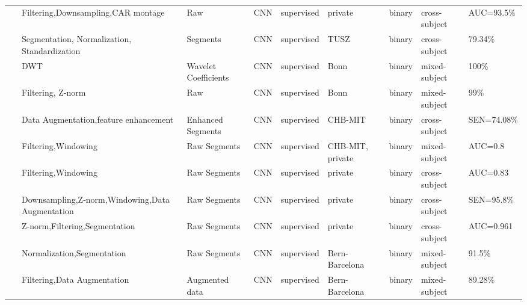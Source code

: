\begin{table*}[ht]
\begin{tabular}{p{0.4cm}p{2.8cm}p{2cm}p{1.5cm}p{1.9cm}p{1.9cm}p{0.8cm}p{1.8cm}p{1.5cm}}
~\cite{Seizure56} & Filtering,Downsampling,\newline CAR montage & Raw & CNN & supervised & private & binary & cross-subject & AUC=93.5\% \\
~\cite{Seizure57} & Segmentation,
Normalization,
Standardization & Segments & CNN & supervised & TUSZ & binary & cross-subject & 79.34\% \\
~\cite{Seizure58} & DWT & Wavelet Coefficients & CNN & supervised & Bonn & binary & mixed-subject & 100\% \\
~\cite{Seizure59} & Filtering,
Z-norm & Raw & CNN & supervised & Bonn & binary & mixed-subject & 99\% \\
~\cite{Seizure60} & Data Augmentation,\newline feature enhancement  & Enhanced Segments & CNN & supervised & CHB-MIT & binary & cross-subject & SEN=74.08\% \\
~\cite{Seizure61} & Filtering,Windowing & Raw Segments & CNN & supervised & CHB-MIT, \newline private & binary & mixed-subject & AUC=0.8 \\
~\cite{Seizure62} & Filtering,Windowing & Raw Segments & CNN & supervised & private & binary & cross-subject & AUC=0.83 \\
 ~\cite{Seizure63} & Downsampling,Z-norm,\newline Windowing,Data Augmentation & Raw Segments & CNN & supervised & private & binary & cross-subject & SEN=95.8\% \\
~\cite{Seizure64} & Z-norm,Filtering,\newline Segmentation & Raw Segments & CNN & supervised & private & binary & cross-subject & AUC=0.961 \\
~\cite{Seizure65} & Normalization,\newline Segmentation & Raw Segments & CNN & supervised & Bern-Barcelona & binary & mixed-subject & 91.5\% \\
~\cite{Seizure66} & Filtering,\newline Data Augmentation & Augmented data & CNN & supervised & Bern-Barcelona & binary & mixed-subject & 89.28\% \\
\hline
\end{tabular}
\end{table*}


